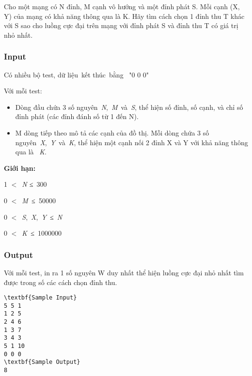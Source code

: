 

Cho một mạng có N đỉnh, M cạnh vô hướng và một đỉnh phát S. Mỗi cạnh (X, Y) của mạng có khả năng thông qua là K. Hãy tìm cách chọn 1 đỉnh thu T khác với S sao cho luồng cực đại trên mạng với đỉnh phát S và đỉnh thu T có giá trị nhỏ nhất.

\subsubsection{Input}

Có nhiều bộ test, dữ liệu kết thúc bằng  "0 0 0"

Với mỗi test:
\begin{itemize}
	\item Dòng đầu chứa 3 số nguyên \emph{N}, \emph{M} và \emph{S}, thể hiện số đỉnh, số cạnh, và chỉ số đỉnh phát (các đỉnh đánh số từ 1 đến N).
	\item M dòng tiếp theo mô tả các cạnh của đồ thị. Mỗi dòng chứa 3 số nguyên \emph{X}, \emph{Y} và \emph{K}, thể hiện một cạnh nối 2 đỉnh X và Y với khả năng thông qua là  \emph{K}.
\end{itemize}

\textbf{Giới hạn:}

1 $<$ \emph{N ≤ }300

0 $<$ \emph{M ≤ }50000

0 $<$ \emph{S}, \emph{X}, \emph{Y}\emph{ ≤ }\emph{N}

0 $<$ \emph{K ≤ }1000000

\subsubsection{Output}

Với mỗi test, in ra 1 số nguyên W duy nhất thể hiện luồng cực đại nhỏ nhất tìm được trong số các cách chọn đỉnh thu.
\begin{verbatim}
\textbf{Sample Input}
5 5 1 
1 2 5 
2 4 6 
1 3 7 
3 4 3 
5 1 10 
0 0 0
\textbf{Sample Output}
8
\end{verbatim}